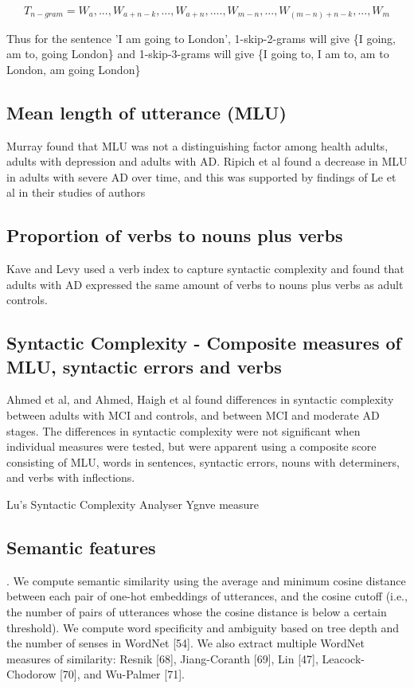 \begin{equation} \label{x4}
T_{n-gram} = {W_{a},...,W_{a+n-k},..., W_{a+n},....,W_{m-n},...,W_{(m-n)+n-k},...,W_{m}}
\end{equation}

Thus for the sentence 'I am going to London', 1-skip-2-grams will give \{I going, am to, going London\} and 1-skip-3-grams will give \{I going to, I am to, am to London, am going London\}

\subsection{Mean length of utterance (MLU)}
Murray found that MLU was not a distinguishing factor among health adults, adults with depression and adults with AD. Ripich et al found a decrease in MLU in adults with severe AD over time, and this was supported by findings of Le et al in their studies of authors \cite{Le2012} \newline
\par 
\subsection{Proportion of verbs to nouns plus verbs}
Kave and Levy used a verb index to capture syntactic complexity and found that adults with AD expressed the same amount of verbs to nouns plus verbs as adult controls. \newline
\par 
\subsection{Syntactic Complexity - Composite measures of MLU, syntactic errors and verbs}
Ahmed et al, and Ahmed, Haigh et al found differences in syntactic complexity between adults with MCI and controls, and between MCI and moderate AD stages. The differences in syntactic complexity were not significant when individual measures were tested, but were apparent using a composite score consisting of MLU, words in sentences, syntactic errors, nouns with determiners, and verbs with inflections. \newline
\par
Lu's Syntactic Complexity Analyser
Ygnve measure

\subsection{Semantic features}. We compute semantic similarity using the average and minimum cosine distance between each pair of one-hot embeddings of utterances, and the cosine cutoff (i.e., the number of pairs of utterances whose the cosine distance is below a certain threshold). We compute word specificity and ambiguity based on tree depth and the number of senses in WordNet [54]. We also extract multiple WordNet measures of similarity: Resnik [68], Jiang-Coranth [69], Lin [47], Leacock-Chodorow [70], and Wu-Palmer [71].

